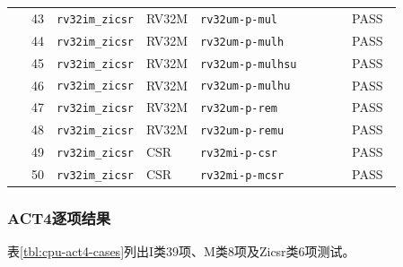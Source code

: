 \begin{reporttable}
\begin{longtable}{@{}r p{0.22\linewidth}p{0.12\linewidth}p{0.39\linewidth}p{0.13\linewidth}@{}}
43 & \texttt{rv32im\_zicsr} & RV32M & \texttt{rv32um-p-mul} & PASS \\
44 & \texttt{rv32im\_zicsr} & RV32M & \texttt{rv32um-p-mulh} & PASS \\
45 & \texttt{rv32im\_zicsr} & RV32M & \texttt{rv32um-p-mulhsu} & PASS \\
46 & \texttt{rv32im\_zicsr} & RV32M & \texttt{rv32um-p-mulhu} & PASS \\
47 & \texttt{rv32im\_zicsr} & RV32M & \texttt{rv32um-p-rem} & PASS \\
48 & \texttt{rv32im\_zicsr} & RV32M & \texttt{rv32um-p-remu} & PASS \\
49 & \texttt{rv32im\_zicsr} & CSR & \texttt{rv32mi-p-csr} & PASS \\
50 & \texttt{rv32im\_zicsr} & CSR & \texttt{rv32mi-p-mcsr} & PASS \\
\end{longtable}
\end{reporttable}

\subsubsection{ACT4逐项结果}
表\ref{tbl:cpu-act4-cases}列出I类39项、M类8项及Zicsr类6项测试。


